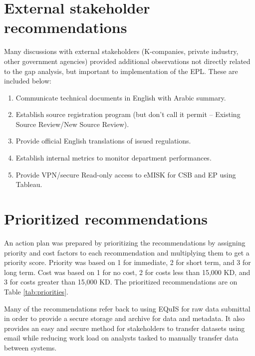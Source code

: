 \section{External stakeholder recommendations}
Many discussions with external stakeholders (K-companies, private industry, other government agencies) provided additional observations not directly related to the gap analysis, but important to implementation of the EPL. These are included below:

\begin{enumerate}
\item Communicate technical documents in English with Arabic summary.
\item Establish source registration program (but don’t call it permit – Existing Source Review/New Source Review).
\item Provide official English translations of issued regulations.
\item Establish internal metrics to monitor department performances.
\item Provide VPN/secure Read-only access to eMISK for CSB and EP using Tableau.
\end{enumerate}

\section{Prioritized recommendations}

An action plan was prepared by prioritizing the recommendations by assigning priority and cost factors to each recommendation and multiplying them to get a priority score. Priority was based on 1 for immediate, 2 for short term, and 3 for long term. Cost was based on 1 for no cost, 2 for costs less than 15,000 KD, and 3 for costs greater than 15,000 KD. The prioritized recommendations are on Table \ref{tab:priorities}.

Many of the recommendations refer back to using EQuIS for raw data submittal in order to provide a secure storage and archive for data and metadata. It also provides an easy and secure method for stakeholders to transfer datasets using email while reducing work load on analysts tasked to manually transfer data between systems.

